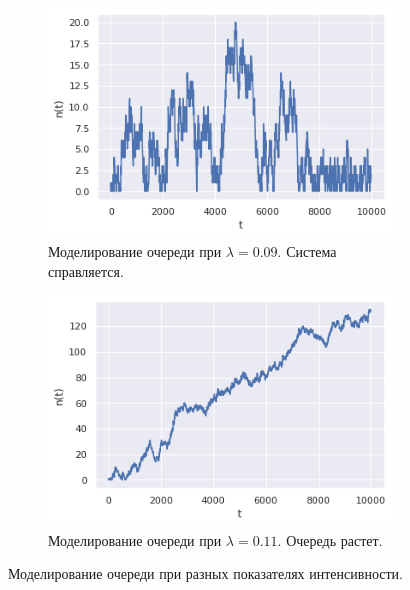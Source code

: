 \begin{figure}[ht]
    \centering
    \begin{subfigure}[b]{0.49\textwidth}
        \centering
        \includegraphics[width=\textwidth]{./resources/queuing_0.09.png}
        \caption{Моделирование очереди при $ \lambda = 0.09 $. Система 
         справляется.}
        \label{subfig:queuing_0.09}
    \end{subfigure}
    \hfill
    \begin{subfigure}[b]{0.49\textwidth}
        \centering
        \includegraphics[width=\textwidth]{./resources/queuing_0.11.png}
        \caption{Моделирование очереди при $ \lambda = 0.11 $. Очередь 
         растет.}
        \label{subfig:queuing_0.11}
    \end{subfigure}
    \caption{Моделирование очереди при разных показателях интенсивности.}
    \label{fig:queuing}
\end{figure}


